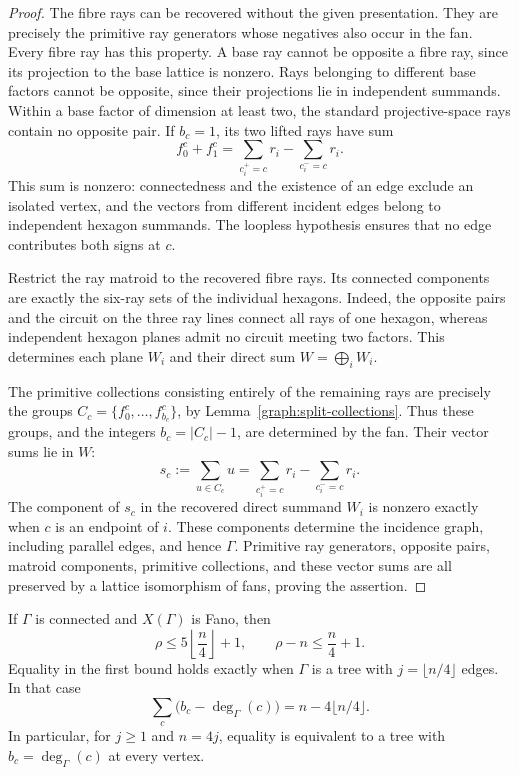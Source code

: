 \begin{proof}
The fibre rays can be recovered without the given presentation.
They are precisely the primitive ray generators whose negatives also
occur in the fan. Every fibre ray has this property. A base ray cannot
be opposite a fibre ray, since its projection to the base lattice is
nonzero. Rays belonging to different base factors cannot be opposite,
since their projections lie in independent summands. Within a base
factor of dimension at least two, the standard projective-space rays
contain no opposite pair. If $b_c=1$, its two lifted rays have sum
\[
 f^c_0+f^c_1=\sum_{c_i^+=c}r_i-\sum_{c_i^-=c}r_i.
\]
This sum is nonzero: connectedness and the existence of an edge exclude
an isolated vertex, and the vectors from different incident edges
belong to independent hexagon summands. The loopless hypothesis ensures
that no edge contributes both signs at $c$.

Restrict the ray matroid to the recovered fibre rays. Its connected
components are exactly the six-ray sets of the individual hexagons.
Indeed, the opposite pairs and the circuit on the three ray lines
connect all rays of one hexagon, whereas independent hexagon planes
admit no circuit meeting two factors. This determines each plane
$W_i$ and their direct sum $W=\bigoplus_iW_i$.

The primitive collections consisting entirely of the remaining rays
are precisely the groups
$C_c=\{f^c_0,\ldots,f^c_{b_c}\}$, by
Lemma~\ref{graph:split-collections}. Thus these groups, and the integers
$b_c=|C_c|-1$, are determined by the fan. Their vector sums lie in $W$:
\[
 s_c:=\sum_{u\in C_c}u
     =\sum_{c_i^+=c}r_i-\sum_{c_i^-=c}r_i.
\]
The component of $s_c$ in the recovered direct summand $W_i$ is nonzero
exactly when $c$ is an endpoint of $i$. These components determine the incidence
graph, including parallel edges, and hence $\Gamma$. Primitive ray
generators, opposite pairs, matroid components, primitive collections,
and these vector sums are all preserved by a lattice isomorphism of
fans, proving the assertion.
\end{proof}

\begin{corollary}\label{graph:ceiling}
If $\Gamma$ is connected and $X(\Gamma)$ is Fano, then
\begin{equation}\label{graph:rank-bound}
 \rho\le5\left\lfloor\frac n4\right\rfloor+1,
 \qquad \rho-n\le\frac n4+1.
\end{equation}
Equality in the first bound holds exactly when $\Gamma$ is a tree
with $j=\lfloor n/4\rfloor$ edges.  In that case
\[
 \sum_c\bigl(b_c-\deg_\Gamma(c)\bigr)=n-4\lfloor n/4\rfloor.
\]
In particular, for $j\ge1$ and $n=4j$, equality is equivalent to a tree
with $b_c=\deg_\Gamma(c)$ at every vertex.
\end{corollary}

